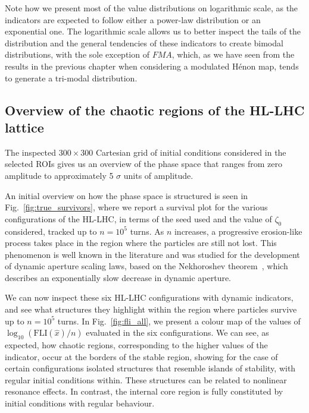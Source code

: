 Note how we present most of the value distributions on logarithmic scale, as the indicators are expected to follow either a power-law distribution or an exponential one. The logarithmic scale allows us to better inspect the tails of the distribution and the general tendencies of these indicators to create bimodal distributions, with the sole exception of $FMA$, which, as we have seen from the results in the previous chapter when considering a modulated Hénon map, tends to generate a tri-modal distribution.

\subsection{Overview of the chaotic regions of the HL-LHC lattice}

The inspected $300\times300$ Cartesian grid of initial conditions considered in the selected ROIs gives us an overview of the phase space that ranges from zero amplitude to approximately 5 $\sigma$ units of amplitude.

An initial overview on how the phase space is structured is seen in Fig.~\ref{fig:true_survivors}, where we report a survival plot for the various configurations of the HL-LHC, in terms of the seed used and the value of $\zeta_0$ considered, tracked up to $n=10^5$ turns. As $n$ increases, a progressive erosion-like process takes place in the region where the particles are still not lost. This phenomenon is well known in the literature and was studied for the development of dynamic aperture scaling laws, based on the Nekhoroshev theorem~\cite{Bazzani:2019csk}, which describes an exponentially slow decrease in dynamic aperture.

We can now inspect these six HL-LHC configurations with dynamic indicators, and see what structures they highlight within the region where particles survive up to $n=10^5$ turns. In Fig.~\ref{fig:fli_all}, we present a colour map of the values of $\log_{10}(\mathrm{FLI}(\hat{x})/n)$ evaluated in the six configurations. We can see, as expected, how chaotic regions, corresponding to the higher values of the indicator, occur at the borders of the stable region, showing for the case of certain configurations isolated structures that resemble islands of stability, with regular initial conditions within. These structures can be related to nonlinear resonance effects. In contrast, the internal core region is fully constituted by initial conditions with regular behaviour.

